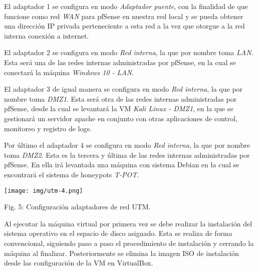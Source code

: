 \documentclass[12pt,oneside,a4paper]{book}
\begin{document}
\vspace{1em}

\hspace{20pt}
El adaptador 1 se configura en modo \textit{Adaptador puente}, con la finalidad de que funcione como red \textit{WAN} para pfSense en nuestra red local y se pueda obtener una dirección IP privada perteneciente a esta red a la vez que otorgue a la red interna conexión a internet.

\vspace{1em}

\hspace{20pt}
El adaptador 2 se configura en modo \textit{Red interna}, la que por nombre toma \textit{LAN}. Esta será una de las redes internas administradas por pfSense, en la cual se conectará la máquina \textit{Windows 10 - LAN}.

\vspace{1em}

\hspace{20pt}
El adaptador 3 de igual manera se configura en modo \textit{Red interna}, la que por nombre toma \textit{DMZ1}. Esta será otra de las redes internas administradas por pfSense, desde la cual se levantará la VM \textit{Kali Linux - DMZ1}, en la que se gestionará un servidor apache en conjunto con otras aplicaciones de control, monitoreo y registro de logs.

\vspace{1em}

\hspace{20pt}
Por último el adaptador 4 se configura en modo \textit{Red interna}, la que por nombre toma \textit{DMZ2}. Esta es la tercera y última de las redes internas administradas por pfSense. En ella irá levantada una máquina con sistema Debian en la cual se encontrará el sistema de honeypots \textit{T-POT}.

\vspace{2em}

\begin{center}
    \texttt{[image: img/utm-4.png]}
    
\vspace{0.1em}
    
    Fig. 5: Configuración adaptadores de red UTM.
\end{center}

\vspace{2em}

\hspace{20pt}
Al ejecutar la máquina virtual por primera vez se debe realizar la instalación del sistema operativo en el espacio de disco asignado. Esta se realiza de forma convencional, siguiendo paso a paso el procedimiento de instalación y cerrando la máquina al finalizar. Posteriormente se elimina la imagen ISO de instalación desde las configuración de la VM en VirtualBox.
\end{document}
